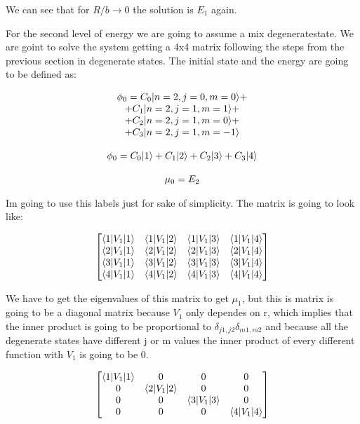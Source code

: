 We can see that for $R/b \to 0$ the solution is $E_1$ again.

For the second level of energy we are going to assume a mix degeneratestate. We are goint to solve the system getting a 4x4 matrix following the steps from the previous section in degenerate states. The initial state and the energy are going to be defined as:

\begin{equation}
  \begin{array}{c}
    \phi_0 = C_0 \lvert n=2,j=0,m=0\rangle +
    \\
    +C_1 \lvert n=2,j=1,m=1\rangle +
    \\
    +C_2 \lvert n=2,j=1,m=0\rangle +
    \\
    +C_3 \lvert n=2,j=1,m=-1\rangle
    \\

    \\
    \phi_0 = C_0 \lvert1\rangle + C_1 \lvert2\rangle + C_2 \lvert3\rangle + C_3 \lvert4\rangle
    \\

    \\
    \mu_0 = E_2
  \end{array}
\end{equation}

Im going to use this labels just for sake of simplicity. The matrix is going to look like:

\begin{equation}
  \begin{bmatrix}
    \langle1\rvert V_1\lvert1\rangle & \langle1\rvert V_1\lvert2\rangle & \langle1\rvert V_1\lvert3\rangle & \langle1\rvert V_1\lvert4\rangle\\
    \langle2\rvert V_1\lvert1\rangle & \langle2\rvert V_1\lvert2\rangle & \langle2\rvert V_1\lvert3\rangle & \langle2\rvert V_1\lvert4\rangle\\
    \langle3\rvert V_1\lvert1\rangle & \langle3\rvert V_1\lvert2\rangle & \langle3\rvert V_1\lvert3\rangle & \langle3\rvert V_1\lvert4\rangle\\
    \langle4\rvert V_1\lvert1\rangle & \langle4\rvert V_1\lvert2\rangle & \langle4\rvert V_1\lvert3\rangle & \langle4\rvert V_1\lvert4\rangle
  \end{bmatrix}
\end{equation}

We have to get the eigenvalues of this matrix to get $\mu_1$, but this is matrix is going to be a diagonal matrix because $V_1$ only dependes on r, which implies that the inner product is going to be proportional to $\delta_{j1,j2}\delta_{m1,m2}$ and because all the degenerate states have different j or m values the inner product of every different function with $V_1$ is going to be 0.

\begin{equation}
  \begin{bmatrix}
    \langle1\rvert V_1\lvert1\rangle & 0 & 0 & 0\\
    0 & \langle2\rvert V_1\lvert2\rangle & 0 & 0\\
    0 & 0 & \langle3\rvert V_1\lvert3\rangle & 0\\
    0 & 0 & 0 & \langle4\rvert V_1\lvert4\rangle
  \end{bmatrix}
\end{equation}

